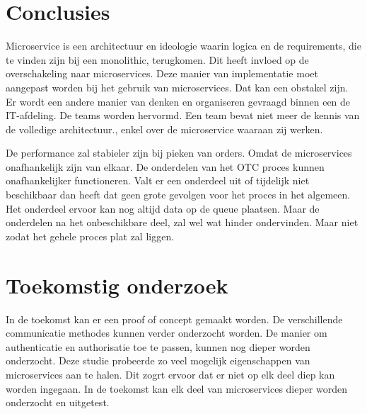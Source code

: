 \documentclass[a0,portrait]{a0poster}
\begin{document}
\begin{multicols}{2}



\color{HoGentAccent1} 
\section*{Conclusies}
\color{black}
Microservice is een architectuur en ideologie waarin logica en de requirements, die te
vinden zijn bij een monolithic, terugkomen. Dit heeft invloed op de overschakeling naar
microservices. Deze manier van implementatie moet aangepast worden bij het gebruik
van microservices. Dat kan een obstakel zijn. Er wordt een andere manier van denken
en organiseren gevraagd binnen een de IT-afdeling. De teams worden hervormd. Een
team bevat niet meer de kennis van de volledige architectuur., enkel over de microservice
waaraan zij werken.

De performance zal stabieler zijn bij pieken van orders. Omdat de microservices
onafhankelijk zijn van elkaar. De onderdelen van het OTC proces kunnen onafhankelijker
functioneren. Valt er een onderdeel uit of tijdelijk niet beschikbaar dan heeft dat geen
grote gevolgen voor het proces in het algemeen. Het onderdeel ervoor kan nog altijd data
op de queue plaatsen. Maar de onderdelen na het onbeschikbare deel, zal wel wat hinder
ondervinden. Maar niet zodat het gehele proces plat zal liggen.
\color{HoGentAccent1} 
\section*{Toekomstig onderzoek}
\color{black}
In de toekomst kan er een proof of concept gemaakt worden. De verschillende communicatie methodes kunnen verder onderzocht worden. De manier om authenticatie en authorisatie toe te passen, kunnen nog dieper worden onderzocht. Deze studie probeerde zo veel mogelijk eigenschappen van microservices aan te halen. Dit zogrt ervoor dat er niet op elk deel diep kan worden ingegaan. In de toekomst kan elk deel van microservices dieper worden onderzocht en uitgetest.



\end{multicols}
\end{document}
